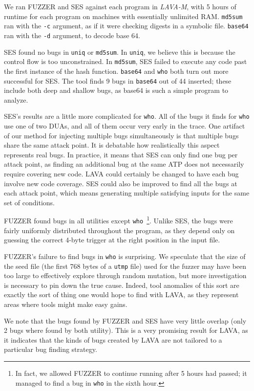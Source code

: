 We ran FUZZER and SES against each program in \emph{LAVA-M}, with 5 hours of runtime for each program on machines with essentially unlimited RAM.
\verb+md5sum+ ran with the \verb+-c+ argument, as if it were checking digests in a symbolic file.
\verb+base64+ ran with the \verb+-d+ argument, to decode base 64.

SES found no bugs in \verb+uniq+ or \verb+md5sum+.
In \verb+uniq+, we believe this is because the control flow is too unconstrained.
In \verb+md5sum+, SES failed to execute any code past the first instance of the hash function.
\verb+base64+ and \verb+who+ both turn out more successful for SES.
The tool finds 9 bugs in \verb+base64+ out of 44 inserted; these include both deep and shallow bugs, as base64 is such a simple program to analyze.

SES's results are a little more complicated for \verb+who+.
All of the bugs it finds for \verb+who+ use one of two DUAs, and all of them occur very early in the trace.
One artifact of our method for injecting multiple bugs simultaneously is that multiple bugs share the same attack point.
It is debatable how realistically this aspect represents real bugs.
In practice, it means that SES can only find one bug per attack point, as finding an additional bug at the same ATP does not necessarily require covering new code.
LAVA could certainly be changed to have each bug involve new code coverage.
SES could also be improved to find all the bugs at each attack point, which means generating multiple satisfying inputs for the same set of conditions.

FUZZER found bugs in all utilities except \verb+who+~\footnote{In fact, we allowed FUZZER to continue running after 5 hours had passed; it managed to find a bug in \texttt{who} in the sixth hour.}.
Unlike SES, the bugs were fairly uniformly distributed throughout the program, as they depend only on guessing the correct 4-byte trigger at the right position in the input file.

FUZZER's failure to find bugs in \verb+who+ is surprising.
We speculate that the size of the seed file (the first 768 bytes of a \verb+utmp+ file) used for the fuzzer may have been too large to effectively explore through random mutation, but more investigation is necessary to pin down the true cause.
Indeed, tool anomalies of this sort are exactly the sort of thing one would hope to find with LAVA, as they represent areas where tools might make easy gains.

We note that the bugs found by FUZZER and SES have very little overlap (only 2 bugs where found by both utility).
This is a very promising result for LAVA, as it indicates that the kinds of bugs created by LAVA are not tailored to a particular bug finding strategy.

